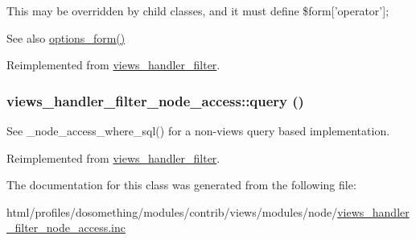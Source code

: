 This may be overridden by child classes, and it must define \$form\mbox{[}'operator'\mbox{]};

\begin{DoxySeeAlso}{See also}
\hyperlink{classviews__handler__filter_af14c69367162057a32709a6340de0988}{options\_\-form()} 
\end{DoxySeeAlso}


Reimplemented from \hyperlink{classviews__handler__filter_a8c77c0a8bba8c3ceceae8950fc7b1121}{views\_\-handler\_\-filter}.\hypertarget{classviews__handler__filter__node__access_ab7f054a6a94abf2f41ce70fd40cf2e5e}{
\subsubsection[{query}]{\setlength{\rightskip}{0pt plus 5cm}views\_\-handler\_\-filter\_\-node\_\-access::query ()}}
\label{classviews__handler__filter__node__access_ab7f054a6a94abf2f41ce70fd40cf2e5e}
See \_\-node\_\-access\_\-where\_\-sql() for a non-\/views query based implementation. 

Reimplemented from \hyperlink{classviews__handler__filter_a8e513b3abbc2559f37b550ca4957b4ae}{views\_\-handler\_\-filter}.

The documentation for this class was generated from the following file:\begin{DoxyCompactItemize}
\item 
html/profiles/dosomething/modules/contrib/views/modules/node/\hyperlink{views__handler__filter__node__access_8inc}{views\_\-handler\_\-filter\_\-node\_\-access.inc}\end{DoxyCompactItemize}
